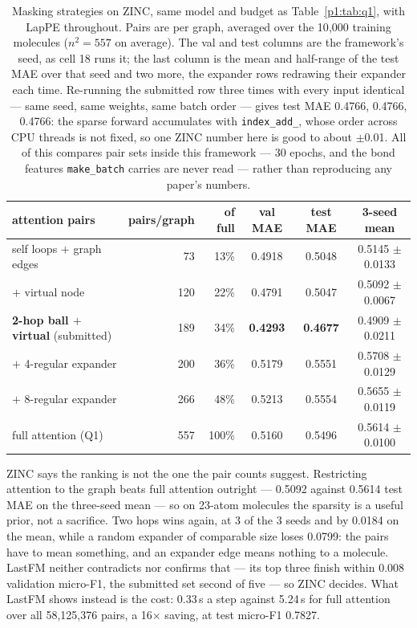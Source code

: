 \begin{table}[H]
\centering
\caption{Masking strategies on ZINC, same model and budget as Table~\ref{p1:tab:q1}, with LapPE throughout. Pairs are per graph, averaged over the 10{,}000 training molecules ($n^2 = 557$ on average). The val and test columns are the framework's seed, as cell 18 runs it; the last column is the mean and half-range of the test MAE over that seed and two more, the expander rows redrawing their expander each time. Re-running the submitted row three times with every input identical --- same seed, same weights, same batch order --- gives test MAE 0.4766, 0.4766, 0.4766: the sparse forward accumulates with \texttt{index\_add\_}, whose order across CPU threads is not fixed, so one ZINC number here is good to about $\pm$0.01. All of this compares pair sets inside this framework --- 30 epochs, and the bond features \texttt{make\_batch} carries are never read --- rather than reproducing any paper's numbers.}
\label{p1:tab:q2}
\small
\begin{tabular}{lrrccc}
\toprule
attention pairs & pairs/graph & of full & val MAE & test MAE & 3-seed mean \\
\midrule
self loops $+$ graph edges & 73 & 13\% & 0.4918 & 0.5048 & 0.5145 $\pm$ 0.0133 \\
$+$ virtual node & 120 & 22\% & 0.4791 & 0.5047 & 0.5092 $\pm$ 0.0067 \\
\textbf{2-hop ball $+$ virtual} (submitted) & 189 & 34\% & \textbf{0.4293} & \textbf{0.4677} & 0.4909 $\pm$ 0.0211 \\
$+$ 4-regular expander & 200 & 36\% & 0.5179 & 0.5551 & 0.5708 $\pm$ 0.0129 \\
$+$ 8-regular expander & 266 & 48\% & 0.5213 & 0.5554 & 0.5655 $\pm$ 0.0119 \\
\midrule
full attention (Q1) & 557 & 100\% & 0.5160 & 0.5496 & 0.5614 $\pm$ 0.0100 \\
\bottomrule
\end{tabular}
\end{table}

ZINC says the ranking is not the one the pair counts suggest. Restricting attention to the graph beats full attention outright --- 0.5092 against 0.5614 test MAE on the three-seed mean --- so on 23-atom molecules the sparsity is a useful prior, not a sacrifice. Two hops wins again, at 3 of the 3 seeds and by 0.0184 on the mean, while a random expander of comparable size loses 0.0799: the pairs have to mean something, and an expander edge means nothing to a molecule. LastFM neither contradicts nor confirms that --- its top three finish within 0.008 validation micro-F1, the submitted set second of five --- so ZINC decides. What LastFM shows instead is the cost: 0.33\,s a step against 5.24\,s for full attention over all 58{,}125{,}376 pairs, a 16$\times$ saving, at test micro-F1 0.7827.


